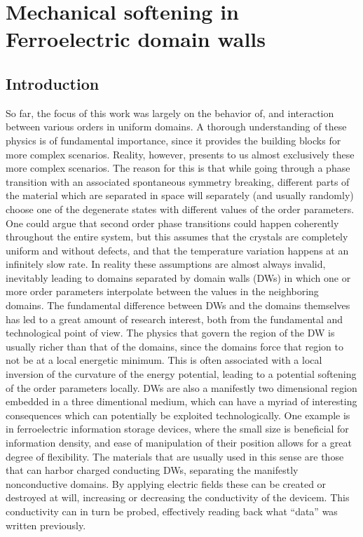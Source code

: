 \chapter{Mechanical softening in Ferroelectric domain walls}


\section{Introduction}
So far, the focus of this work was largely on the behavior of, and interaction between various orders in uniform domains.
A thorough understanding of these physics is of fundamental importance, since it provides the building blocks for more complex scenarios.
Reality, however, presents to us almost exclusively these more complex scenarios.
The reason for this is that while going through a phase transition with an associated spontaneous symmetry breaking, different parts of the material which are separated in space will separately (and usually randomly) choose one of the degenerate states with different values of the order parameters.
One could argue that second order phase transitions could happen coherently throughout the entire system, but this assumes that the crystals are completely uniform and without defects, and that the temperature variation happens at an infinitely slow rate.
In reality these assumptions are almost always invalid, inevitably leading to domains separated by domain walls (DWs) in which one or more order parameters interpolate between the values in the neighboring domains.
The fundamental difference between DWs and the domains themselves has led to a great amount of research interest, both from the fundamental and technological point of view.
The physics that govern the region of the DW is usually richer than that of the domains, since the domains force that region to not be at a local energetic minimum.
This is often associated with a local inversion of the curvature of the energy potential, leading to a potential softening of the order parameters locally.
DWs are also a manifestly two dimensional region embedded in a three dimentional medium, which can have a myriad of interesting consequences which can potentially be exploited technologically.
One example is in ferroelectric information storage devices, where the small size is beneficial for information density, and ease of manipulation of their position allows for a great degree of flexibility.
The materials that are usually used in this sense are those that can harbor charged conducting DWs, separating the manifestly nonconductive domains.
By applying electric fields these can be created or destroyed at will, increasing or decreasing the conductivity of the devicem.
This conductivity can in turn be probed, effectively reading back what ``data'' was written previously.

